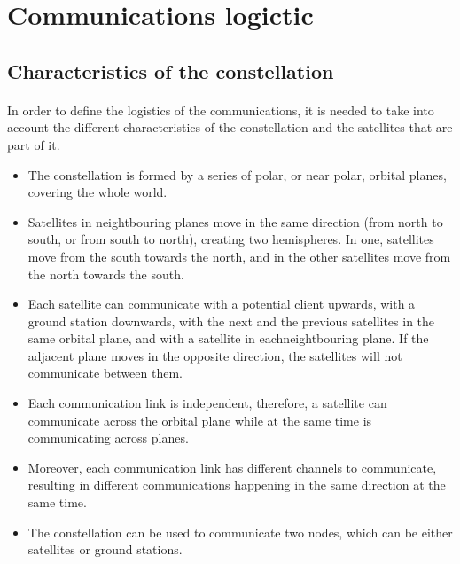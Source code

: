 \documentclass[12pt,a4paper]{article}
\begin{document}
\section{Communications logictic}

\subsection{Characteristics of the constellation}
\paragraph{}In order to define the logistics of the communications, it is needed to take into account the different characteristics of the constellation and the satellites that are part of it.
\begin{itemize}
\item The constellation is formed by a series of polar, or near polar, orbital planes, covering the whole world.
\item Satellites in neightbouring planes move in the same direction (from north to south, or from south to north), creating two hemispheres. In one, satellites move from the south towards the north, and in the other satellites move from the north towards the south.
\item Each satellite can communicate with a potential client upwards, with a ground station downwards, with the next and the previous satellites in the same orbital plane, and with a satellite in eachneightbouring plane. If the adjacent plane moves in the opposite direction, the satellites will not communicate between them.
\item Each communication link is independent, therefore, a satellite can communicate across the orbital plane while at the same time is communicating across planes.
\item Moreover, each communication link has different channels to communicate, resulting in different communications happening in the same direction at the same time.
\item The constellation can be used to communicate two nodes, which can be either satellites or ground stations.
\end{itemize}
\end{document}
